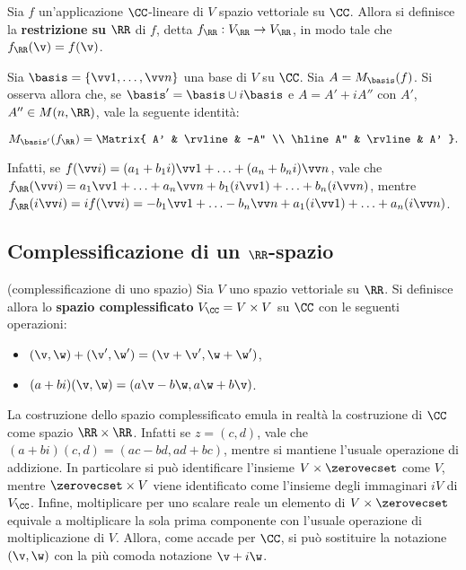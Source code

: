 \begin{definition}
	Sia $f$ un'applicazione $\CC$-lineare di $V$ spazio vettoriale su $\CC$. Allora
	si definisce la \textbf{restrizione su} $\RR$ di $f$, detta $f_\RR : V_\RR \to V_\RR$,
	in modo tale che $f_\RR(\v) = f(\v)$.
\end{definition}

\begin{remark}
	Sia $\basis = \{\vv 1, \ldots, \vv n\}$ una base di $V$ su $\CC$. Sia $A = M_\basis(f)$. Si
	osserva allora che, se $\basis' = \basis \cup i \basis$ e $A = A' + i A''$ con $A'$, $A'' \in M(n, \RR)$,
	vale la seguente identità:
	
	\[ M_{\basis'}(f_\RR) = \Matrix{ A' & \rvline & -A'' \\ \hline A'' & \rvline & A' }. \]
	
	Infatti, se $f(\vv i) = (a_1 + b_1 i) \vv 1 + \ldots + (a_n + b_n i) \vv n$, vale che
	$f_\RR(\vv i) = a_1 \vv 1 + \ldots + a_n \vv n + b_1 (i \vv 1) + \ldots + b_n (i \vv n)$,
	mentre $f_\RR(i \vv i) = i f(\vv i) = - b_1 \vv 1 + \ldots - b_n \vv n + a_1 (i \vv 1) + \ldots + a_n (i \vv n)$.
\end{remark}

\subsection{Complessificazione di un $\RR$-spazio}

\begin{definition} (complessificazione di uno spazio) Sia $V$ uno spazio vettoriale su $\RR$.
	Si definisce allora lo \textbf{spazio complessificato} $V_\CC = V \times V$ su $\CC$ con le seguenti operazioni:
	
	\begin{itemize}
		\item $(\v, \w) + (\v', \w') = (\v + \v', \w + \w')$,
		\item $(a+bi)(\v, \w) = (a\v - b\w, a\w + b\v)$.
	\end{itemize}
\end{definition}

\begin{remark}
	La costruzione dello spazio complessificato emula in realtà la costruzione di $\CC$ come spazio
	$\RR \times \RR$. Infatti se $z = (c, d)$, vale che $(a + bi)(c, d) = (ac - bd, ad + bc)$, mentre
	si mantiene l'usuale operazione di addizione. In particolare si può identificare l'insieme
	$V \times \zerovecset$ come $V$, mentre $\zerovecset \times V$ viene identificato come l'insieme
	degli immaginari $iV$ di $V_\CC$. Infine, moltiplicare per uno scalare reale un elemento di
	$V \times \zerovecset$ equivale a moltiplicare la sola prima componente con l'usuale operazione
	di moltiplicazione di $V$. Allora, come accade per $\CC$, si può sostituire la notazione
	$(\v, \w)$ con la più comoda notazione $\v + i \w$.
\end{remark}

